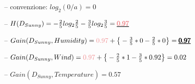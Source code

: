 \begin{frame}
\begin{itemize}
\begin{columns}
		\end{columns}
		
		\begin{itemize} 
			\vspace{0.3em}
			\item[--] convenzione: $log_{2} (0/a) = 0$
			\vspace{0.3em}
 			\item[--] $H(D_{Sunny}) = -\frac{2}{5} log_{2} \frac{2}{5} - \frac{3}{5} log_{2} \frac{3}{5} = \pmb{\underline{{\color{GradientDescentDiagramRed}0.97}}}$
			\vspace{0.3em}
 			\item[--] $Gain(D_{Sunny}, Humidity) = {\color{GradientDescentDiagramRed}0.97} + \big\{ -\frac{3}{5} * 0 - \frac{2}{5} * 0 \big\} = \pmb{\underline{0.97}}$
 			\vspace{0.3em}
			\item[--] $Gain(D_{Sunny}, Wind) = {\color{GradientDescentDiagramRed}0.97} + \big\{ -\frac{2}{5} * 1 -\frac{3}{5} * 0.92 \big\} = 0.02$
			\vspace{0.3em}
			\item[--] $Gain(D_{Sunny}, Temperature) = 0.57$
		\end{itemize}
%		
%		
		
	\end{itemize}
	
\end{frame}


